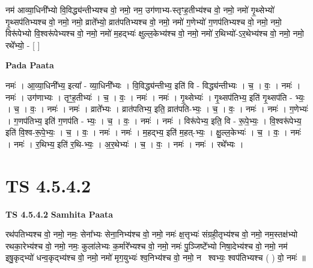 \documentclass[17pt]{extarticle}
\begin{document}
नम॑ आव्या॒धिनी᳚भ्यो वि॒विद्ध्य॑न्तीभ्यश्च वो॒ नमो॒                             नम॒ उग॑णाभ्य-स्तृꣳह॒तीभ्य॑श्च वो॒ नमो॒                                          नमो॑ गृ॒थ्सेभ्यो॑ गृ॒थ्सप॑तिभ्यश्च वो॒ नमो॒                                                नमो॒ व्राते᳚भ्यो॒ व्रात॑पतिभ्यश्च वो॒ नमो॒                                             नमो॑ ग॒णेभ्यो॑ ग॒णप॑तिभ्यश्च वो॒ नमो॒                                                      नमो॒ विरू॑पेभ्यो वि॒श्वरू॑पेभ्यश्च वो॒ नमो॒                                            नमो॑ म॒हद्भ्यः॑ क्षुल्ल॒केभ्य॑श्च वो॒ नमो॒                                           नमो॑ र॒थिभ्यो॑-ऽर॒थेभ्य॑श्च वो॒ नमो॒                                                       नमो॒ रथे᳚भ्यो॒ - [  ] \newline

\textbf{Pada Paata} \newline

नमः॑ । आ॒व्या॒धिनी᳚भ्य॒ इत्या᳚ - व्या॒धिनी᳚भ्यः । वि॒विद्ध्य॑न्तीभ्य॒ इति॑ वि - विद्ध्य॑न्तीभ्यः । च॒ । वः॒ । नमः॑ । नमः॑ । उग॑णाभ्यः । तृꣳ॒॒ह॒तीभ्यः॑ । च॒ । वः॒ । नमः॑ । नमः॑ । गृ॒थ्सेभ्यः॑ । गृ॒थ्सप॑तिभ्य॒ इति॑ गृ॒थ्सप॑ति - भ्यः॒ । च॒ । वः॒ । नमः॑ । नमः॑ । व्राते᳚भ्यः । व्रात॑पतिभ्य॒ इति॒ व्रात॑पति-भ्यः॒ । च॒ । वः॒ । नमः॑ । नमः॑ । ग॒णेभ्यः॑ । ग॒णप॑तिभ्य॒ इति॑ ग॒णप॑ति - भ्यः॒ । च॒ । वः॒ । नमः॑ । नमः॑ । विरू॑पेभ्य॒ इति॒ वि - रू॒पे॒भ्यः॒ । वि॒श्वरू॑पेभ्य॒ इति॑ वि॒श्व-रू॒पे॒भ्यः॒ । च॒ । वः॒ । नमः॑ । नमः॑ । म॒हद्भ्य॒ इति॑ म॒हत्-भ्यः॒ । क्षु॒ल्ल॒केभ्यः॑ । च॒ । वः॒ । नमः॑ । नमः॑ । र॒थिभ्य॒ इति॑ र॒थि-भ्यः॒ । अ॒र॒थेभ्यः॑ । च॒ । वः॒ । नमः॑ । नमः॑ । रथे᳚भ्यः ।  \newline





\section{ TS 4.5.4.2 }

\textbf{TS 4.5.4.2 } \newline
\textbf{Samhita Paata} \newline

रथ॑पतिभ्यश्च वो॒ नमो॒                                                      नमः॒ सेना᳚भ्यः सेना॒निभ्य॑श्च वो॒ नमो॒                                               नमः॑ क्ष॒त्तृभ्यः॑ संग्रही॒तृभ्य॑श्च वो॒ नमो॒                                     नम॒स्तक्ष॑भ्यो रथका॒रेभ्य॑श्च वो॒ नमो॒                                                    नमः॒ कुला॑लेभ्यः क॒र्मारे᳚भ्यश्च वो॒ नमो॒                                            नमः॑ पु॒ञ्जिष्टे᳚भ्यो निषा॒देभ्य॑श्च वो॒ नमो॒                                                नम॑ इषु॒कृद्भ्यो॑ धन्व॒कृद्भ्य॑श्च वो॒ नमो॒                                                नमो॑ मृग॒युभ्यः॑ श्व॒निभ्य॑श्च वो॒ नमो॒                                                     नमः᳡श्वभ्यः॒ श्वप॑तिभ्यश्च ( ) वो॒ नमः॑ ॥ \newline
\end{document}

